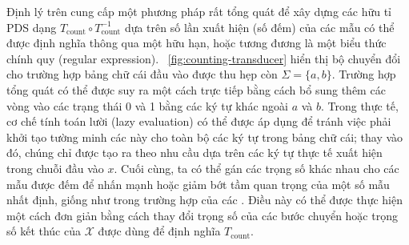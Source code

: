 Định lý trên cung cấp một phương pháp rất tổng quát để xây dựng các 
hữu tỉ PDS dạng $T_{\text{count}} \circ T_{\text{count}}^{-1}$ dựa trên số lần
xuất hiện (số đếm) của các mẫu có thể được định nghĩa thông qua một
 hữu hạn, hoặc tương đương là một biểu thức chính quy (regular
expression). \figurename~\ref{fig:counting-transducer} hiển thị bộ chuyển đổi
cho trường hợp bảng chữ cái đầu vào được thu hẹp còn $\Sigma = \{a, b\}$.
Trường hợp tổng quát có thể được suy ra một cách trực tiếp bằng cách bổ sung
thêm các vòng vào các trạng thái 0 và 1 bằng các ký tự khác ngoài $a$ và
$b$. Trong thực tế, cơ chế tính toán lười (lazy evaluation) có thể được áp dụng
để tránh việc phải khởi tạo tường minh các  này cho toàn bộ các
ký tự trong bảng chữ cái; thay vào đó, chúng chỉ được tạo ra theo nhu cầu  dựa
trên các ký tự thực tế xuất hiện trong chuỗi đầu vào $x$. Cuối cùng, ta
có thể gán các trọng số khác nhau cho các mẫu được đếm để nhấn mạnh hoặc giảm
bớt tầm quan trọng của một số mẫu nhất định, giống như trong trường hợp của các
. Điều này có thể được thực hiện một cách đơn giản bằng cách
thay đổi trọng số của các bước chuyển hoặc trọng số kết thúc của 
$\mathcal X$ được dùng để định nghĩa $T_{\text{count}}$.
